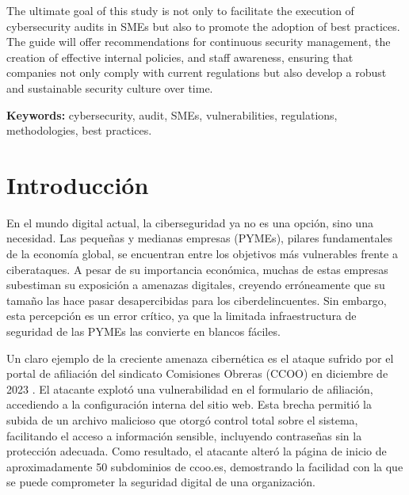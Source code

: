 \documentclass[a4paper, 10pt]{article}
\begin{document}
The ultimate goal of this study is not only to facilitate the execution of cybersecurity audits in SMEs but also to promote the adoption of best practices. The guide will offer recommendations for continuous security management, the creation of effective internal policies, and staff awareness, ensuring that companies not only comply with current regulations but also develop a robust and sustainable security culture over time.

\par\vspace{0.5cm}
\textbf{Keywords:} cybersecurity, audit, SMEs, vulnerabilities, regulations, methodologies, best practices.
\clearpage



\section{Introducción}
En el mundo digital actual, la ciberseguridad ya no es una opción, sino una necesidad. Las pequeñas y medianas empresas (PYMEs), pilares fundamentales de la economía global, se encuentran entre los objetivos más vulnerables frente a ciberataques. A pesar de su importancia económica, muchas de estas empresas subestiman su exposición a amenazas digitales, creyendo erróneamente que su tamaño las hace pasar desapercibidas para los ciberdelincuentes. Sin embargo, esta percepción es un error crítico, ya que la limitada infraestructura de seguridad de las PYMEs las convierte en blancos fáciles.
\par\vspace{0.5cm}

Un claro ejemplo de la creciente amenaza cibernética es el ataque sufrido por el portal de afiliación del sindicato Comisiones Obreras (CCOO) en diciembre de 2023 \cite{farlopa}. El atacante explotó una vulnerabilidad en el formulario de afiliación, accediendo a la configuración interna del sitio web. Esta brecha permitió la subida de un archivo malicioso que otorgó control total sobre el sistema, facilitando el acceso a información sensible, incluyendo contraseñas sin la protección adecuada. Como resultado, el atacante alteró la página de inicio de aproximadamente 50 subdominios de ccoo.es, demostrando la facilidad con la que se puede comprometer la seguridad digital de una organización.
\par\vspace{0.5cm}
\end{document}
